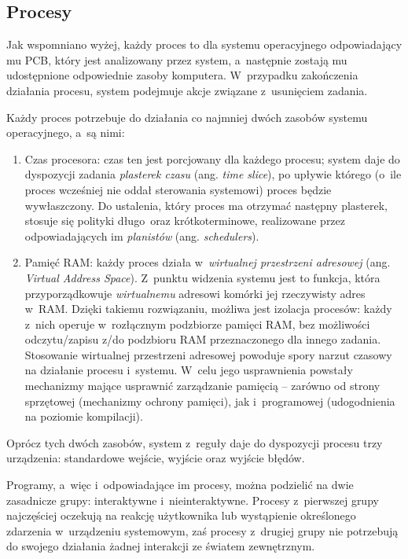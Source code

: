 \documentclass[12pt]{mwart}
\begin{document}
\subsection{Procesy}
\indent
  Jak wspomniano wyżej, każdy proces to dla systemu operacyjnego odpowiadający mu PCB, który jest analizowany przez system, a~następnie
  zostają mu udostępnione odpowiednie zasoby komputera. W~przypadku zakończenia działania procesu, system podejmuje akcje związane z~usunięciem zadania.
\par
%
\indent
  Każdy proces potrzebuje do działania co najmniej dwóch zasobów systemu operacyjnego, a~są nimi:
  \begin{enumerate}
    \item Czas procesora: czas ten jest porcjowany dla każdego procesu; system daje do dyspozycji zadania \emph{plasterek czasu} (ang. \emph{time slice}),
      po upływie którego (o~ile proces wcześniej nie oddał sterowania systemowi) proces będzie wywłaszczony. Do ustalenia, który proces ma otrzymać następny plasterek,
      stosuje się polityki długo\dywiz ~oraz krótkoterminowe, realizowane przez odpowiadających im \emph{planistów} (ang. \emph{schedulers}).
    \item Pamięć RAM: każdy proces działa w~\emph{wirtualnej przestrzeni adresowej} (ang. \emph{Virtual Address Space}). 
      Z~punktu widzenia systemu jest to funkcja, która przyporządkowuje \emph{wirtualnemu} adresowi komórki jej rzeczywisty adres w~RAM.
      Dzięki takiemu rozwiązaniu, możliwa jest izolacja procesów: każdy z~nich operuje w~rozłącznym podzbiorze pamięci RAM, bez możliwości
      odczytu/zapisu z/do podzbioru RAM przeznaczonego dla innego zadania.
      Stosowanie wirtualnej przestrzeni adresowej powoduje spory narzut czasowy na działanie procesu i~systemu. W~celu jego usprawnienia powstały mechanizmy 
      mające usprawnić zarządzanie pamięcią -- zarówno od strony sprzętowej
      (mechanizmy ochrony pamięci), jak i~programowej (udogodnienia na poziomie kompilacji).
  \end{enumerate}
  Oprócz tych dwóch zasobów, system z~reguły daje do dyspozycji procesu trzy urządzenia: standardowe wejście, wyjście oraz wyjście błędów.
\par
%
\indent
  Programy, a~więc i~odpowiadające im procesy, można podzielić na dwie zasadnicze grupy: interaktywne i~nieinteraktywne.
  Procesy z~pierwszej grupy najczęściej oczekują na reakcję użytkownika lub wystąpienie określonego zdarzenia w~urządzeniu systemowym,
  zaś procesy z~drugiej grupy nie potrzebują do swojego działania żadnej interakcji ze światem zewnętrznym.
\end{document}
